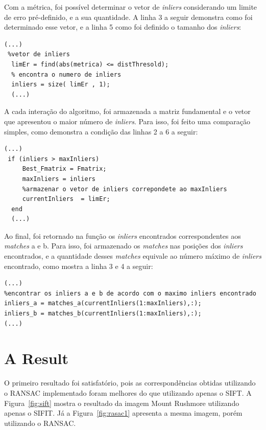Com a métrica, foi possível determinar o vetor de \textit{inliers} considerando um limite de erro pré-definido, e a sua quantidade. A linha 3 a seguir demonstra como foi determinado esse vetor, e a linha 5 como foi definido o tamanho dos \textit{inliers}:  

\begin{lstlisting}[style=Matlab-editor]
(...)
 %vetor de inliers
  limEr = find(abs(metrica) <= distThresold); 
  % encontra o numero de inliers
  inliers = size( limEr , 1);  
  (...)  
\end{lstlisting}

A cada interação do algoritmo, foi armazenada a matriz fundamental e o vetor que apresentou o maior número de \textit{inliers}. Para isso, foi feito uma comparação simples, como demonstra a condição das linhas 2 a 6 a seguir:

\begin{lstlisting}[style=Matlab-editor]
(...)
 if (inliers > maxInliers)
     Best_Fmatrix = Fmatrix;
     maxInliers = inliers
     %armazenar o vetor de inliers correpondete ao maxInliers
     currentInliers  = limEr;   
  end 
  (...)  
\end{lstlisting}

Ao final, foi retornado na função os \textit{inliers} encontrados correspondentes aos \textit{matches} a e b. Para isso, foi armazenado os \textit{matches} nas posições dos \textit{inliers} encontrados, e a quantidade desses \textit{matches} equivale ao número máximo de \textit{inliers} encontrado, como mostra a linha 3 e 4 a seguir:

\begin{lstlisting}[style=Matlab-editor]
(...)
%encontrar os inliers a e b de acordo com o maximo inliers encontrado
inliers_a = matches_a(currentInliers(1:maxInliers),:);
inliers_b = matches_b(currentInliers(1:maxInliers),:);
(...)  
\end{lstlisting}

\section*{A Result}

O primeiro resultado foi satisfatório, pois as correspondências obtidas utilizando o RANSAC implementado foram melhores do que utilizando apenas o SIFT. A Figura~\ref{fig:sift} mostra o resultado da imagem Mount Rushmore utilizando apenas o SIFIT. Já a Figura~\ref{fig:rasac1} apresenta a mesma imagem, porém utilizando o RANSAC.


